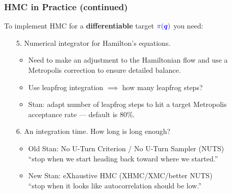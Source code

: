 \documentclass[xcolor=dvipsnames]{beamer}
\begin{document}
\begin{frame}
\frametitle{HMC in Practice (continued)}
To implement HMC for a \textbf{differentiable} target ${\color{blue}\pi(\bm{q})}$ you need:
\vspace{0.2cm}
\begin{enumerate}
\item[5.] Numerical integrator for Hamilton's equations.
\begin{itemize}
\item Need to make an adjustment to the Hamiltonian flow and use a Metropolis correction to ensure detailed balance.
\vspace{0.2cm}
\item Use leapfrog integration $\implies$ how many leapfrog steps?
\vspace{0.2cm}
\item Stan: adapt number of leapfrog steps to hit a target Metropolis acceptance rate --- default is 80\%.
\end{itemize}
\vspace{0.2cm}
\item[6.] An integration time. How long is long enough?
\begin{itemize}
\item Old Stan: No U-Turn Criterion / No U-Turn Sampler (NUTS) \\
\vspace{0.2cm}
``stop when we start heading back toward where we started.''
\vspace{0.2cm}
\item New Stan: eXhaustive HMC (XHMC/XMC/better NUTS) \\
\vspace{0.2cm}
``stop when it looks like autocorrelation should be low.''
\vspace{0.2cm}
\end{itemize}
\end{enumerate}
\end{frame}
\end{document}

